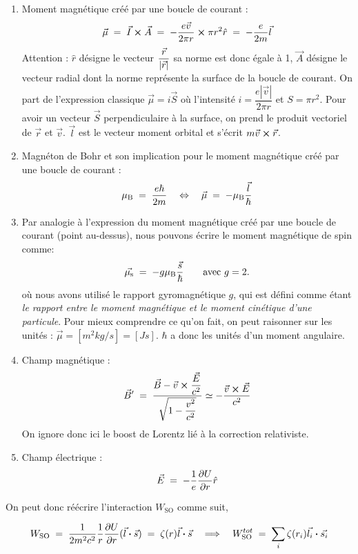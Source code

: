 \begin{enumerate}
    \item Moment magnétique créé par une boucle de courant :
    \[
        \vec{\mu} \; = \; \vec{I}\cross \vec{A} \; = \; -\dfrac{e\vec{v}}{2\pi r}\cross \pi r^2\hat{r} \; = \; -\dfrac{e}{2m}\vec{l}
    \]
    Attention : $\hat{r}$ désigne le vecteur $\dfrac{\vec{r}}{\abs{\vec{r}}}$ sa norme est donc égale à 1, $\vec{A}$ désigne le vecteur radial dont la norme représente la surface de la boucle de courant. On part de l'expression classique $\vec{\mu} = i\vec{S}$ où l'intensité $i = \dfrac{e|\vec{v}|}{2\pi r}$ et $S = \pi r^2$. Pour avoir un vecteur $\vec{S}$ perpendiculaire à la surface, on prend le produit vectoriel de $\vec{r}$ et $\vec{v}$. $\vec{l}$ est le vecteur moment orbital et s'écrit $m\vec{v}\cross\vec{r}$.
    \item Magnéton de Bohr et son implication pour le moment magnétique créé par une boucle de courant :
    \[
        \mu_\text{B} \; = \; \dfrac{e\hbar}{2m} \quad \Leftrightarrow \quad \vec{\mu} \; = \; -\mu_\text{B}\dfrac{\vec{l}}{\hbar}
    \]
    \item Par analogie à l'expression du moment magnétique créé par une boucle de courant (point au-dessus), nous pouvons écrire le moment magnétique de spin comme:
    \[
        \vec{\mu_\text{s}} \; = \; -g\mu_\text{B}\dfrac{\vec{s}}{\hbar} \qquad \textrm{avec } g=2.
    \]
    où nous avons utilisé le rapport gyromagnétique $g$, qui est défini comme étant \emph{le rapport entre le moment magnétique  et le moment cinétique d'une particule}.
    Pour mieux comprendre ce qu'on fait, on peut raisonner sur les unités : $\vec{\mu} = [\si{m^2kg/s}] = [\si{Js}]$. $\hbar$ a donc les unités d'un moment angulaire.
    \item Champ magnétique :
    \[
        \vec{B}' \; = \; \dfrac{\vec{B} - \vec{v}\cross \dfrac{\vec{E}}{c^2}}{\sqrt{1-\dfrac{v^2}{c^2}}} \simeq -\dfrac{\vec{v}\cross \vec{E}}{c^2}
    \]
    On ignore donc ici le boost de Lorentz lié à la correction relativiste.
    \item Champ électrique :
    \[
        \vec{E} \; = \;  -\dfrac{1}{e}\dfrac{\partial U}{\partial r}\hat{r}
    \]
\end{enumerate}

On peut donc réécrire l'interaction $W_\text{SO}$ comme suit,

\begin{equation}
    W_\text{SO} \; = \;  \dfrac{1}{2m^2c^2}\dfrac{1}{r}\dfrac{\partial U}{\partial r}(\vec{l}\boldsymbol{\cdot}\vec{s}) \; = \;  \zeta(r)\vec{l}\boldsymbol{\cdot}\vec{s}
    \quad\Longrightarrow\quad
    W_\text{SO}^{tot} \; = \; \sum_i\zeta(r_i)\vec{l_i}\boldsymbol{\cdot}\vec{s_i}
    \label{eq:Hamilt_SO}
\end{equation}

